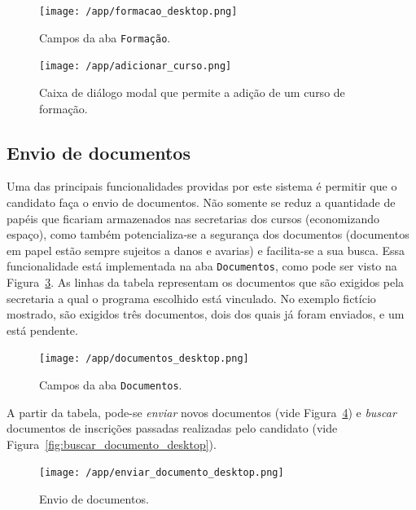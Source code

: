 \documentclass[
  10.5pt,				  %
	openright,			%
	twoside,			  %
  a5paper,
  chapter=TITLE,	%
	section=TITLE,	%
  hyphens,        %
	english,        %
	brazil          %
]{abntex2}
\begin{document}
\begin{figure}[!ht]
  \caption{\label{fig:formacao_desktop} Campos da aba \texttt{Formação}.}
  \begin{center}
    \texttt{[image: /app/formacao\_desktop.png]}
  \end{center}
\end{figure}


\begin{figure}[!ht]
  \caption{\label{fig:adicionar_curso} Caixa de diálogo modal que permite a adição de um curso de formação.}
  \begin{center}
    \texttt{[image: /app/adicionar\_curso.png]}
  \end{center}
\end{figure}



\subsection{Envio de documentos}\label{sec:envio_documentos}

Uma das principais funcionalidades providas por este sistema é permitir que o candidato faça o envio de documentos. Não somente se reduz a quantidade de papéis que ficariam armazenados nas secretarias dos cursos (economizando espaço), como também potencializa-se a segurança dos documentos (documentos em papel estão sempre sujeitos a danos e avarias) e facilita-se a sua busca. Essa funcionalidade está implementada na aba \texttt{Documentos}, como pode ser visto na Figura~\ref{fig:documentos_desktop}. As linhas da tabela representam os documentos que são exigidos pela secretaria a qual o programa escolhido está vinculado. No exemplo fictício mostrado, são exigidos três documentos, dois dos quais já foram enviados, e um está pendente.
%
\begin{figure}[!ht]
  \caption{\label{fig:documentos_desktop} Campos da aba \texttt{Documentos}.}
  \begin{center}
    \texttt{[image: /app/documentos\_desktop.png]}
  \end{center}
\end{figure}

A partir da tabela, pode-se \emph{enviar} novos documentos (vide Figura~\ref{fig:enviar_documento_desktop}) e \emph{buscar} documentos de inscrições passadas realizadas pelo candidato (vide Figura~\ref{fig:buscar_documento_desktop}).
%
\begin{figure}[!ht]
  \caption{\label{fig:enviar_documento_desktop} Envio de documentos.}
  \begin{center}
    \texttt{[image: /app/enviar\_documento\_desktop.png]}
  \end{center}
\end{figure}
\end{document}
